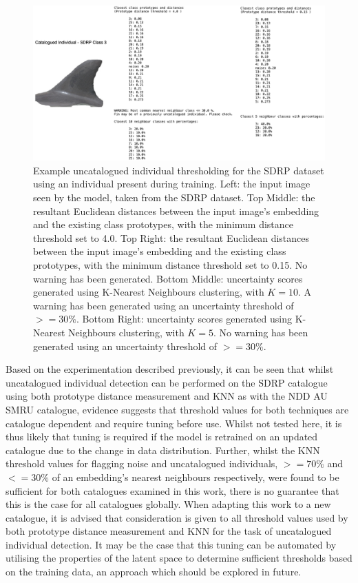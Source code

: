\begin{figure}[t]
	\begin{center}
		\includegraphics[width=0.9\linewidth]{Chapter7/figs/catalogued-individual-thresholding-updated.png}
	\end{center}
	\caption[Example uncatalogued individual thresholding for the SDRP dataset using an individual present during training.]{Example uncatalogued individual thresholding for the SDRP dataset using an individual present during training. Left: the input image seen by the model, taken from the SDRP dataset. Top Middle: the resultant Euclidean distances between the input image's embedding and the existing class prototypes, with the minimum distance threshold set to 4.0. Top Right: the resultant Euclidean distances between the input image's embedding and the existing class prototypes, with the minimum distance threshold set to 0.15. No warning has been generated. Bottom Middle: uncertainty scores generated using K-Nearest Neighbours clustering, with $K = 10$. A warning has been generated using an uncertainty threshold of $>=30\%$. Bottom Right: uncertainty scores generated using K-Nearest Neighbours clustering, with $K = 5$. No warning has been generated using an uncertainty threshold of $>=30\%$.}
	\label{fig:catalogued-individual-example-sdrp}
\end{figure}

Based on the experimentation described previously, it can be seen that whilst uncatalogued individual detection can be performed on the SDRP catalogue using both prototype distance measurement and KNN as with the NDD AU SMRU catalogue, evidence suggests that threshold values for both techniques are catalogue dependent and require tuning before use. Whilst not tested here, it is thus likely that tuning is required if the model is retrained on an updated catalogue due to the change in data distribution. Further, whilst the KNN threshold values for flagging noise and uncatalogued individuals, $>=70\%$ and $<=30\%$  of an embedding's nearest neighbours respectively, were found to be sufficient for both catalogues examined in this work, there is no guarantee that this is the case for all catalogues globally. When adapting this work to a new catalogue, it is advised that consideration is given to all threshold values used by both prototype distance measurement and KNN for the task of uncatalogued individual detection. It may be the case that this tuning can be automated by utilising the properties of the latent space to determine sufficient thresholds based on the training data, an approach which should be explored in future.

